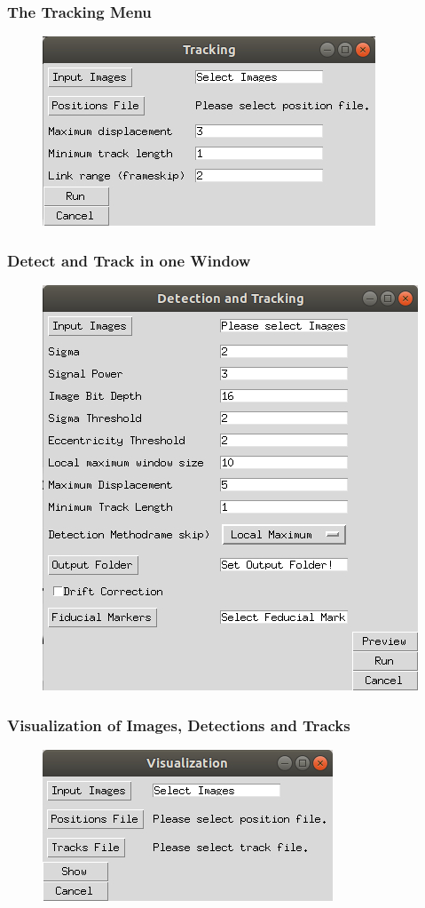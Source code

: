 \documentclass[oneside,letterpaper]{scrartcl}
\begin{document}
\subsubsection{The Tracking Menu}
\begin{figure}
\includegraphics[scale=1.]{Figures/TrackingGUI.jpg}
\end{figure}
\subsubsection{Detect and Track in one Window}
\begin{figure}
\includegraphics[scale=1.]{Figures/DetandTrackGUI.jpg}
\end{figure}
\subsubsection{Visualization of Images, Detections and Tracks}
\begin{figure}
\includegraphics[scale=1.]{Figures/VisualizationGUI.jpg}
\end{figure}
\end{document}
